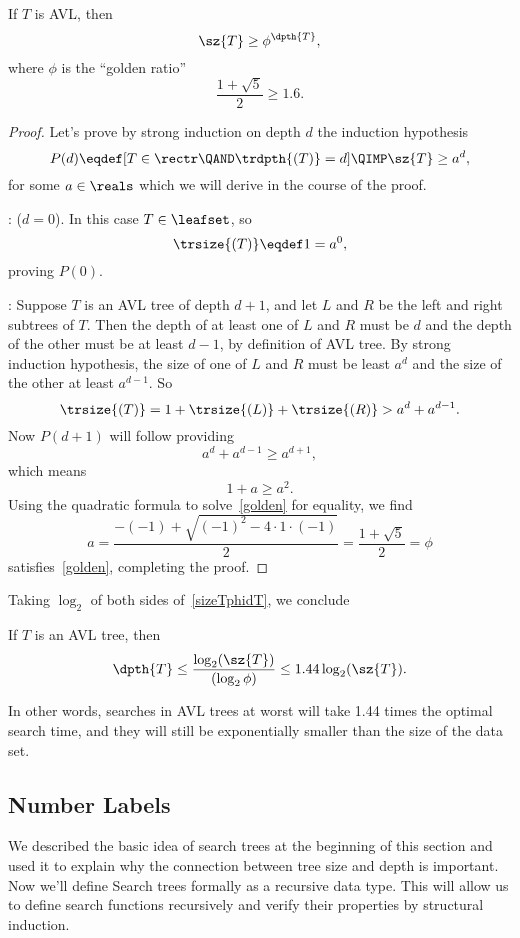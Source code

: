 \begin{definition}
\begin{lemma}\label{avl_size}
If $T$ is AVL, then
\begin{equation}\label{sizeTphidT}
\sz{T} \geq \phi^{\dpth{T}}, 
\end{equation}
where $\phi$ is the ``golden ratio''
\[
\frac{1+\sqrt{5}}{2} \geq 1.6.
\]

\begin{proof}
Let's prove by strong induction on depth $d$ the induction hypothesis
\[
P(d) \eqdef [T \in \rectr \QAND \trdpth{(T)} = d] \QIMP \sz{T}
\geq a^d,
\]
for some $a \in \reals$ which we will derive in the course of the
proof.

: ($d=0$).
In this case $T \in \leafset$, so
\[
\trsize{(T)} \eqdef 1 = a^0,
\]
proving $P(0)$.

: Suppose $T$ is an AVL tree of depth
$d+1$, and let $L$ and $R$ be the left and right subtrees of $T$.
Then the depth of at least one of $L$ and $R$ must be $d$ and the
depth of the other must be at least $d-1$, by definition of AVL tree.
By strong induction hypothesis, the size of one of $L$ and $R$ must be
least $a^d$ and the size of the other at least $a^{d-1}$.  So
\[
\trsize{(T)}
  = 1 + \trsize{(L)} + \trsize{(R)}
  > a^d + a^{d-1}.
\]            
Now $P(d+1)$ will follow providing
\[
 a^d + a^{d-1} \geq a^{d+1},
\]
which means
\begin{equation}\label{golden}
1+a \geq a^2.
\end{equation}
Using the quadratic formula to solve~\eqref{golden} for equality, we find
\[
a = \frac{-(-1) + \sqrt{(-1)^2-4\cdot 1\cdot (-1)}}{2} = \frac{1 + \sqrt{5}}{2} = \phi
\]
satisfies~\eqref{golden}, completing the proof.
\end{proof}
\end{lemma}

Taking $\log_2$ of both sides of~\eqref{sizeTphidT}, we conclude
\begin{corollary}
If $T$ is an AVL tree, then
\[
\dpth{T} \leq \frac{\log_2(\sz{T})}{(\log_2 \phi)} \leq 1.44
\log_2(\sz{T}).
\]
\end{corollary}
In other words, searches in AVL trees at worst will take 1.44 times
the optimal search time, and they will still be exponentially smaller
than the size of the data set.

\subsection{Number Labels}\label{sec:labels}
We described the basic idea of search trees at the beginning of this
section and used it to explain why the connection between tree size
and depth is important.  Now we'll define Search trees formally as a
recursive data type.  This will allow us to define search functions
recursively and verify their properties by structural induction.


\end{definition}
